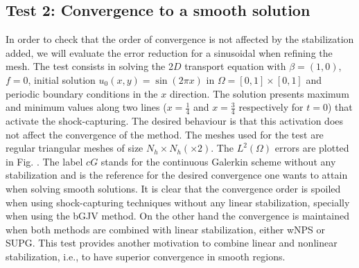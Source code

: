 \subsection{Test 2: Convergence to a smooth solution}

In order to check that the order of convergence is not affected by the stabilization added, we will evaluate the error reduction for a sinusoidal when refining the mesh. The test consists in solving the 2$D$ transport equation  with $\beta = (1,0)$, $f=0$, initial solution $u_0(x,y) = \sin(2\pi x)$ in $\Omega=[0,1]\times[0,1]$ and periodic boundary conditions in the $x$ direction. The solution presents  maximum and minimum values along two lines ($x=\frac{1}{4}$ and $x=\frac{3}{4}$ respectively for $t=0$) that activate the shock-capturing. The desired behaviour is that this activation does not affect the convergence of the method. The meshes used for the test are regular triangular meshes of size $N_h\times N_h(\times 2)$. The $L^2(\Omega)$ errors are plotted in Fig. . The label $cG$ stands for the continuous Galerkin scheme without any stabilization and is the reference for the desired convergence one wants to attain when solving smooth solutions. It is clear that the convergence order is spoiled when using shock-capturing techniques without any linear stabilization, specially when using the bGJV method. On the other hand the convergence is maintained when both methods are combined with linear stabilization, either wNPS or SUPG. This test provides another motivation to combine linear and nonlinear stabilization, i.e., to have superior convergence in smooth regions.

